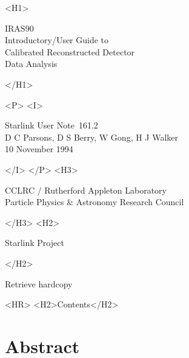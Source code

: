 \documentclass[twoside,11pt]{article}
\newcommand{\stardoccategory}  {Starlink User Note}
\newcommand{\stardocsource}    {sun\stardocnumber}
\newcommand{\stardocnumber}    {161.2}
\newcommand{\stardocauthors}   {D C Parsons, D S Berry, W Gong, H J Walker}
\newcommand{\stardocdate}      {10 November 1994}
\newcommand{\stardoctitle}     {IRAS90\\[2ex]
                                Introductory/User Guide to\\[2ex] 
                                Calibrated Reconstructed Detector\\[2ex]
                                Data Analysis}
\newcommand{\htmladdnormallink}[2]{#1}
\newcommand{\htmladdimg}[1]{}
\newcommand{\htmlref}[2]{#1}
\newcommand{\htmladdtonavigation}[1]{}
\newcommand{\xlabel}[1]{}
\begin{document}
\begin{htmlonly}
   \xlabel{}
   \begin{rawhtml} <H1> \end{rawhtml}
      \stardoctitle
   \begin{rawhtml} </H1> \end{rawhtml}


   \begin{rawhtml} <P> <I> \end{rawhtml}
   \stardoccategory\ \stardocnumber \\
   \stardocauthors \\
   \stardocdate
   \begin{rawhtml} </I> </P> <H3> \end{rawhtml}
      \htmladdnormallink{CCLRC}{http://www.cclrc.ac.uk} /
      \htmladdnormallink{Rutherford Appleton Laboratory}
                        {http://www.cclrc.ac.uk/ral} \\
      \htmladdnormallink{Particle Physics \& Astronomy Research Council}
                        {http://www.pparc.ac.uk} \\
   \begin{rawhtml} </H3> <H2> \end{rawhtml}
      \htmladdnormallink{Starlink Project}{http://www.starlink.ac.uk/}
   \begin{rawhtml} </H2> \end{rawhtml}
   \htmladdnormallink{\htmladdimg{source.gif} Retrieve hardcopy}
      {http://www.starlink.ac.uk/cgi-bin/hcserver?\stardocsource}\\

  \label{stardoccontents}
  \begin{rawhtml} 
    <HR>
    <H2>Contents</H2>
  \end{rawhtml}
  \htmladdtonavigation{\htmlref{\htmladdimg{contents_motif.gif}}
        {stardoccontents}}

  \section{\xlabel{abstract}Abstract}
\end{htmlonly}
\end{document}
